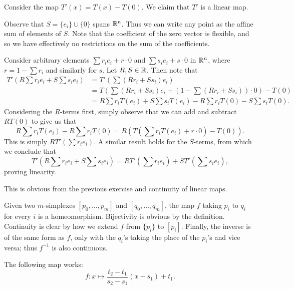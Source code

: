 \documentclass[../solutions.tex]{subfiles}
\begin{document}
\begin{exercise} \leavevmode
Consider the map $T'(x)=T(x)-T(0)$. We claim that $T'$ is a linear map. 

Observe that $S=\{e_i\}\cup\{0\}$ spans $\mathbb{R}^n$. Thus we can write any point as the affine sum of elements of $S$. Note that the coefficient of the zero vector is flexible, and so we have effectively no restrictions on the sum of the coefficients. 

Consider arbitrary elements $\sum r_ie_i+r\cdot0$ and $\sum s_ie_i+s\cdot0$ in $\mathbb{R}^n$, where $r=1-\sum r_i$ and similarly for $s$. Let $R,S\in\mathbb{R}$. Then note that \begin{align*}T'\left(R\sum r_ie_i+S\sum s_ie_i\right)&=T'\left(\sum(Rr_i+Ss_i)e_i\right)\\&= T\left(\sum(Rr_i+Ss_i)e_i+\left(1-\sum(Rr_i+Ss_i)\right)\cdot0\right)-T(0)\\&=R\sum r_iT(e_i)+S\sum s_iT(e_i)-R\sum r_iT(0)-S\sum s_iT(0).\end{align*} Considering the $R$-terms first, simply observe that we can add and subtract $RT(0)$ to give us that \[R\sum r_iT(e_i)-R\sum r_iT(0)=R\left(T\left(\sum r_i T(e_i)+r\cdot0\right)-T(0)\right).\] This is simply $RT'\left(\sum r_ie_i\right)$. A similar result holds for the $S$-terms, from which we conclude that \[T'\left(R\sum r_ie_i+S\sum s_ie_i\right)=RT'\left(\sum r_ie_i\right)+ST'\left(\sum s_ie_i\right),\] proving linearity. 
\end{exercise} 

\begin{exercise} \leavevmode
This is obvious from the previous exercise and continuity of linear maps. 
\end{exercise} 

\begin{exercise} \leavevmode
Given two $m$-simplexes $[p_0,\dots,p_m]$ and $[q_0,\dots,q_m]$, the map $f$ taking $p_i$ to $q_i$ for every $i$ is a homeomorphism. Bijectivity is obvious by the definition. Continuity is clear by how we extend $f$ from $\{p_i\}$ to $[p_i]$. Finally, the inverse is of the same form as $f$, only with the $q_i$'s taking the place of the $p_i$'s and vice versa; thus $f^{-1}$ is also continuous. 
\end{exercise} 

\begin{exercise} \leavevmode
The following map works: \[f:x\mapsto\frac{t_2-t_1}{s_2-s_1}(x-s_1)+t_1.\] 
\end{exercise} 
\end{document}
